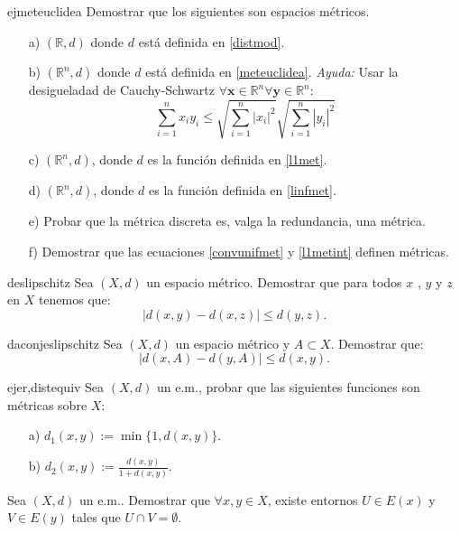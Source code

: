 \begin{ejercicio}{ejmeteuclidea} Demostrar que los siguientes son espacios métricos.

\begin{itemize}
	\item[a)] $(\mathbb{R},d)$ donde $d$ está definida en
	\vref{distmod}.
	\item[b)]  $(\mathbb{R}^n, d)$ donde $d$ está definida en \vref{meteuclidea}.
	\emph{Ayuda:} Usar
la desigueladad de Cauchy-Schwartz
$\forall\mathbf{x}\in\mathbb{R}^n\forall\mathbf{y}\in\mathbb{R}^n$:
\[
	\sum\limits_{i=1}^{n}x_iy_i\leq
	\sqrt{\sum\limits_{i=1}^{n}|x_i|^2}
	\sqrt{\sum\limits_{i=1}^{n}|y_i|^2}
\]
\item[c)] $(\mathbb{R}^n, d)$, donde $d$ es la función definida
en \vref{l1met}.

\item[d)]$(\mathbb{R}^n, d)$, donde $d$ es la función definida
en \vref{linfmet}.
\item[e)] Probar que la métrica discreta es, valga la
redundancia, una métrica.
\item[f)] Demostrar que las ecuaciones \vref{convunifmet} y
\vref{l1metint} definen métricas.
\end{itemize}
\end{ejercicio}

\begin{ejercicio}{deslipschitz} Sea $(X,d)$ un espacio métrico. Demostrar que
para todos $x$ , $y$ y $z$ en $X$ tenemos que:
\[|d(x,y)-d(x,z)|\leq d(y,z).\]
\end{ejercicio}

\begin{ejercicio}{daconjeslipschitz} Sea $(X,d)$ un espacio
métrico y $A\subset X$. Demostrar que:
\[|d(x,A)-d(y,A)|\leq d(x,y).\]
\end{ejercicio}

\begin{ejercicio}{ejer,distequiv} Sea $(X,d)$ un e.m., probar que las siguientes
funciones son métricas sobre $X$:
\begin{itemize}
\item[a)] $d_1(x,y):=\min\{1,d(x,y)\}$.
\item[b)] $d_2(x,y):=\frac{d(x,y)}{1+d(x,y)}$.
\end{itemize}
\end{ejercicio}

\begin{ejercicio}{} Sea $(X,d)$ un e.m.. Demostrar que $\forall
x,y\in X$, existe entornos $U\in E(x)$ y $V\in E(y)$ tales que
$U\cap V=\emptyset$.
\end{ejercicio}

